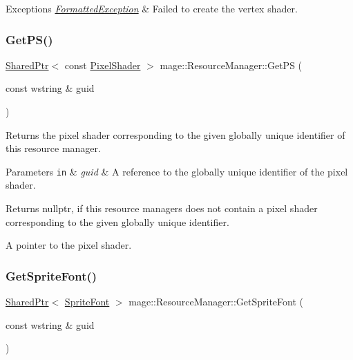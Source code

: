\begin{DoxyExceptions}{Exceptions}
{\em \hyperlink{structmage_1_1_formatted_exception}{Formatted\+Exception}} & Failed to create the vertex shader. \\
\hline
\end{DoxyExceptions}
\hypertarget{classmage_1_1_resource_manager_acf32120f85d46e82d2ddcfc8fe66bea7}{}\label{classmage_1_1_resource_manager_acf32120f85d46e82d2ddcfc8fe66bea7} 
\subsubsection{\texorpdfstring{Get\+P\+S()}{GetPS()}}
{\footnotesize\ttfamily \hyperlink{namespacemage_a1e01ae66713838a7a67d30e44c67703e}{Shared\+Ptr}$<$ const \hyperlink{namespacemage_a27ecaf266420ee7a494d64edc0757129}{Pixel\+Shader} $>$ mage\+::\+Resource\+Manager\+::\+Get\+PS (\begin{DoxyParamCaption}\item[{const wstring \&}]{guid }\end{DoxyParamCaption})\hspace{0.3cm}{\ttfamily [noexcept]}}

Returns the pixel shader corresponding to the given globally unique identifier of this resource manager.


\begin{DoxyParams}[1]{Parameters}
\mbox{\tt in}  & {\em guid} & A reference to the globally unique identifier of the pixel shader. \\
\hline
\end{DoxyParams}
\begin{DoxyReturn}{Returns}
{\ttfamily nullptr}, if this resource managers does not contain a pixel shader corresponding to the given globally unique identifier. 

A pointer to the pixel shader. 
\end{DoxyReturn}
\hypertarget{classmage_1_1_resource_manager_a6ad7dc799e076da85d4638380b1838ff}{}\label{classmage_1_1_resource_manager_a6ad7dc799e076da85d4638380b1838ff} 
\subsubsection{\texorpdfstring{Get\+Sprite\+Font()}{GetSpriteFont()}}
{\footnotesize\ttfamily \hyperlink{namespacemage_a1e01ae66713838a7a67d30e44c67703e}{Shared\+Ptr}$<$ \hyperlink{classmage_1_1_sprite_font}{Sprite\+Font} $>$ mage\+::\+Resource\+Manager\+::\+Get\+Sprite\+Font (\begin{DoxyParamCaption}\item[{const wstring \&}]{guid }\end{DoxyParamCaption})\hspace{0.3cm}{\ttfamily [noexcept]}}

